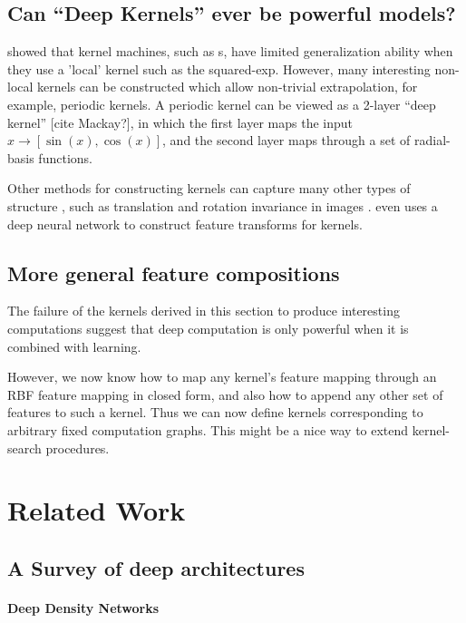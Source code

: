 \documentclass{article}
\begin{document}
\subsection{Can ``Deep Kernels'' ever be powerful models?}

\cite{NIPS2005_424} showed that kernel machines, such as \gp{}s, have limited generalization ability when they use a 'local' kernel such as the squared-exp.  However, many interesting non-local kernels can be constructed which allow non-trivial extrapolation, for example, periodic kernels. A periodic kernel can be viewed as a 2-layer ``deep kernel'' [cite Mackay?], in which the first layer maps the input $x \rightarrow [\sin(x), \cos(x)]$, and the second layer maps through a set of radial-basis functions.  

Other methods for constructing kernels can capture many other types of structure \cite{DuvLloGroetal13, wilsonadams2013}, such as translation and rotation invariance in images \cite{kondor2008group}.  \cite{SalHin08} even uses a deep neural network to construct feature transforms for kernels.

\subsection{More general feature compositions}

The failure of the kernels derived in this section to produce interesting computations suggest that deep computation is only powerful when it is combined with learning.  

However, we now know how to map any kernel's feature mapping through an RBF feature mapping in closed form, and also how to append any other set of features to such a kernel.  Thus we can now define kernels corresponding to arbitrary fixed computation graphs.  This might be a nice way to extend kernel-search procedures.


\section{Related Work}

\subsection{A Survey of deep architectures}

\paragraph{Deep Density Networks} 
\cite{rippel2013high}
\end{document}
